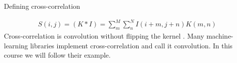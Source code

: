 \documentclass{beamer}
\begin{document}
    \begin{frame}{Defining cross-correlation}
        
        \begin{align}
            S(i,j) = (K*I) = \sum_m^M \sum_n^N I(i+m, j+n)K(m,n)
        \end{align}
        Cross-correlation is convolution without flipping the kernel \cite{goodfellow2016deep}.
        Many machine-learning libraries implement cross-correlation and
        call it convolution. In this course we will follow their example.
    \end{frame}
\end{document}

